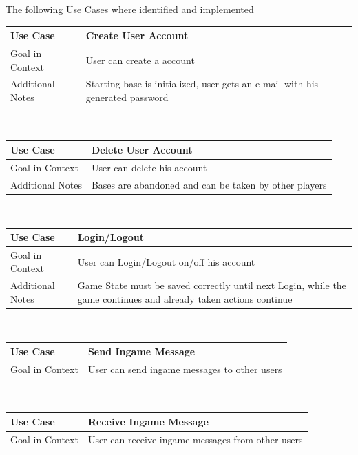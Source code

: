 \documentclass[a4paper]{article}
\begin{document}
The following Use Cases where identified and implemented

\begin{tabular}[t]{|l|l|p{7cm}|}
\hline
\textbf{Use Case}	&	\multicolumn{2}{|l|}{\textbf{Create User Account}}\\
\hline
Goal in Context	&	\multicolumn{2}{|l|}{User can create a account}\\
\hline
Additional Notes	&	\multicolumn{2}{|p{10cm}|}{Starting base is initialized, user gets an e-mail with his generated password}\\
\hline
\end{tabular}\\

\begin{tabular}[t]{|l|l|l|}
\hline
\textbf{Use Case}	&	\multicolumn{2}{|l|}{\textbf{Delete User Account}}\\
\hline
Goal in Context	&	\multicolumn{2}{|l|}{User can delete his account}\\
\hline
Additional Notes	&	\multicolumn{2}{|l|}{Bases are abandoned and can be taken by other players}\\
\hline
\end{tabular}\\

\begin{tabular}[t]{|l|l|p{7cm}|}
\hline
\textbf{Use Case}	&	\multicolumn{2}{|p{7cm}|}{\textbf{Login/Logout}}\\
\hline
Goal in Context	&	\multicolumn{2}{|p{7cm}|}{User can Login/Logout on/off his account}\\
\hline
Additional Notes	&	\multicolumn{2}{|p{10cm}|}{Game State must be saved correctly until next Login, while the game continues and already taken actions continue}\\
\hline
\end{tabular}\\

\begin{tabular}[t]{|l|l|l|}
\hline
\textbf{Use Case}	&	\multicolumn{2}{|l|}{\textbf{Send Ingame Message}}\\
\hline
Goal in Context	&	\multicolumn{2}{|l|}{User can send ingame messages to other users}\\
\hline
\end{tabular}\\

\begin{tabular}[t]{|l|l|l|}
\hline
\textbf{Use Case}	&	\multicolumn{2}{|l|}{\textbf{Receive Ingame Message}}\\
\hline
Goal in Context	&	\multicolumn{2}{|l|}{User can receive ingame messages from other users}\\
\hline
\end{tabular}\\
\end{document}
